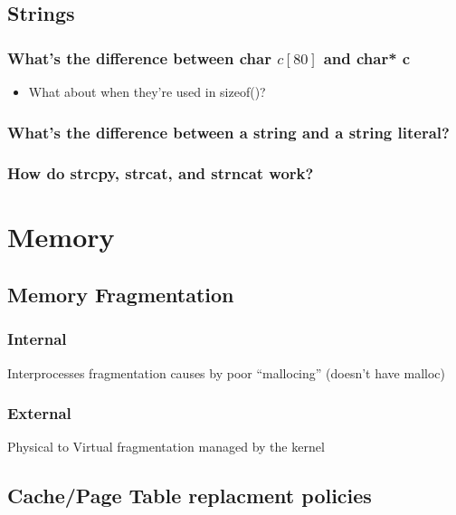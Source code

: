 \documentclass[11pt]{article}
\begin{document}
\subsection{Strings}
\label{sec-4.4}

\subsubsection{What's the difference between char $c[ 80 ]$ and char* c}
\label{sec-4.4.1}

\begin{itemize}

\item What about when they're used in sizeof()?\\
\label{sec-4.4.1.1}

\end{itemize} %
\subsubsection{What's the difference between a string and a string literal?}
\label{sec-4.4.2}

\subsubsection{How do strcpy, strcat, and strncat work?}
\label{sec-4.4.3}

\section{Memory}
\label{sec-5}

\subsection{Memory Fragmentation}
\label{sec-5.1}

\subsubsection{Internal}
\label{sec-5.1.1}

    Interprocesses fragmentation causes by poor ``mallocing'' (doesn't
    have malloc)
\subsubsection{External}
\label{sec-5.1.2}

    Physical to Virtual fragmentation managed by the kernel
\subsection{Cache/Page Table replacment policies}
\label{sec-5.2}
\end{document}
